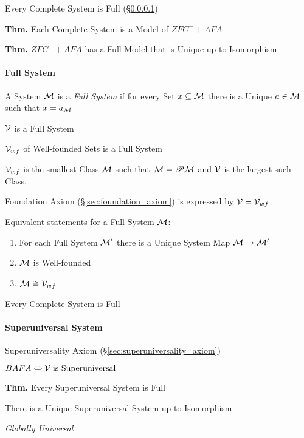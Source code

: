 Every Complete System is Full (\S\ref{sec:full_system})

\textbf{Thm.} Each Complete System is a Model of $ZFC^- + AFA$

\textbf{Thm.} $ZFC^- + AFA$ has a Full Model that is Unique up to
Isomorphism



\paragraph{Full System}\label{sec:full_system}\hfill

A System $\mathcal{M}$ is a \emph{Full System} if for every Set $x
\subseteq \mathcal{M}$ there is a Unique $a \in \mathcal{M}$ such that $x
= a_\mathcal{M}$

$\mathcal{V}$ is a Full System

$\mathcal{V}_{wf}$ of Well-founded Sets is a Full System

$\mathcal{V}_{wf}$ is the smallest Class $\mathcal{M}$ such that
$\mathcal{M} = \mathscr{P}\mathcal{M}$ and $\mathcal{V}$ is the largest such Class.

Foundation Axiom (\S\ref{sec:foundation_axiom}) is expressed by
$\mathcal{V} = \mathcal{V}_{wf}$

Equivalent statements for a Full System $\mathcal{M}$:
\begin{enumerate}
  \item For each Full System $\mathcal{M}'$ there is a Unique System Map
    $\mathcal{M} \rightarrow \mathcal{M}'$
  \item $\mathcal{M}$ is Well-founded
  \item $\mathcal{M} \cong \mathcal{V}_{wf}$
\end{enumerate}

Every Complete System is Full



\paragraph{Superuniversal System}\label{sec:superuniversal_system}
\hfill

Superuniversality Axiom (\S\ref{sec:superuniversality_axiom})

$BAFA \Leftrightarrow \mathcal{V} \;\text{is Superuniversal}$

\textbf{Thm.} Every Superuniversal System is Full

There is a Unique Superuniversal System up to Isomorphism

\emph{Globally Universal}


